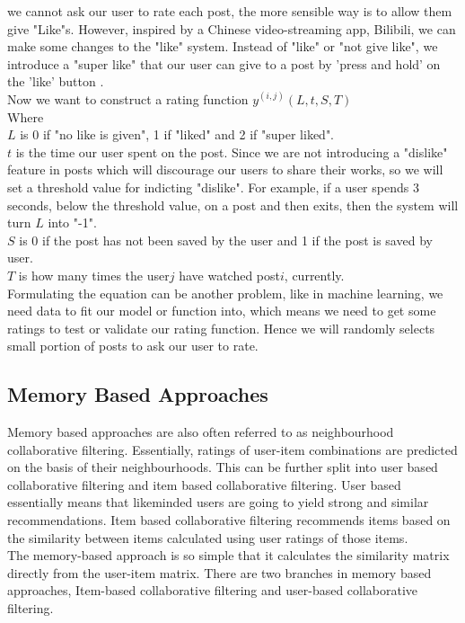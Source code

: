 we cannot ask our user to rate each post, the more sensible way is to allow them give "Like"s. However, inspired by a Chinese video-streaming app, Bilibili, we can make some changes to the "like" system. 
Instead of "like" or "not give like", we introduce a "super like" that our user can give to a post by 'press and hold' on the 'like' button .
\\Now we want to construct a rating function $y^{(i,j)}(L,t,S,T)$
\\Where
\\$L$ is 0 if "no like is given", 1 if "liked" and 2 if "super liked".
\\$t$ is the time our user spent on the post. Since we are not introducing a "dislike" feature in posts which will discourage our users to share their works,
 so we will set a threshold value for indicting "dislike". For example, if a user spends 3 seconds, below the threshold value, on a post and then exits, then the system will turn $L$ into "-1".
\\$S$ is 0 if the post has not been saved by the user and 1 if the post is saved by user.
\\$T$ is how many times the user$j$ have watched post$i$, currently.
\\Formulating the equation can be another problem, like in machine learning, we need data to fit our model or function into, which means we need to get some ratings to test or validate our rating function. 
Hence we will randomly selects small portion of posts to ask our user to rate.


\subsection{Memory Based Approaches}
Memory based approaches are also often referred to as neighbourhood collaborative filtering. Essentially, ratings of user-item combinations are predicted on the basis of their neighbourhoods. 
This can be further split into user based collaborative filtering and item based collaborative filtering. 
User based essentially means that likeminded users are going to yield strong and similar recommendations. Item based collaborative filtering recommends items based on the similarity between items calculated using user ratings of those items.
\\The memory-based approach is so simple that it calculates the similarity matrix directly from the user-item matrix. There are two branches in memory based approaches, Item-based collaborative filtering and user-based collaborative filtering.

